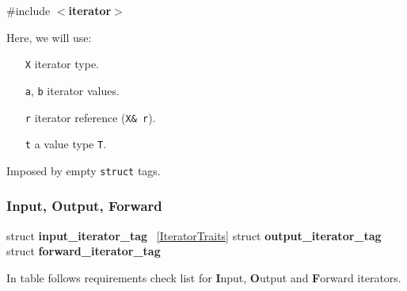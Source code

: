 \begin{multicols}{4}
\#include $<$\textbf{iterator}$>$
\vskip -10pt

 \label{IteratorsCategories}

Here, we will use:
\begin{itemize} \itemCondense
 \item[\texttt{X}] iterator type.
 \item[\texttt{a}, \texttt{b}] iterator values.
 \item[\texttt{r}] iterator reference (\verb+X& r+).
 \item[\texttt{t}] a value type \texttt{T}.
\end{itemize}

Imposed by empty \texttt{struct} tags.

\subsubsection{Input, Output, Forward}

struct \textbf{input_iterator_tag} \lb\rb 
                                   \seeExample\ \ref{IteratorTraits} \newline
struct \textbf{output_iterator_tag} \lb\rb\newline
struct \textbf{forward_iterator_tag} \lb\rb

In table follows
requirements check list for
\textbf{I}nput,
\textbf{O}utput and
\textbf{F}orward
iterators.



\end{multicols}
